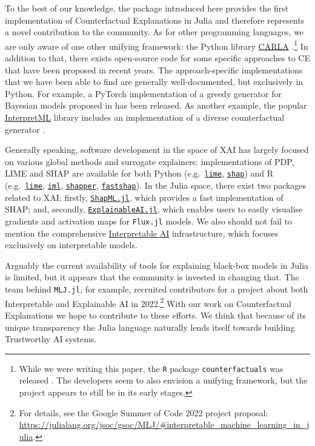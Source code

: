 \documentclass[
  letterpaper,
  DIV=11,
  numbers=noendperiod]{scrartcl}
\begin{document}
To the best of our knowledge, the package introduced here provides the
first implementation of Counterfactual Explanations in Julia and
therefore represents a novel contribution to the community. As for other
programming languages, we are only aware of one other unifying
framework: the Python library
\href{https://carla-counterfactual-and-recourse-library.readthedocs.io/en/latest/?badge=latest}{CARLA}
\cite{pawelczyk2021carla}.\footnote{While we were writing this paper,
  the \texttt{R} package \texttt{counterfactuals} was released
  \cite{dandl2023counterfactuals}. The developers seem to also envision
  a unifying framework, but the project appears to still be in its early
  stages.} In addition to that, there exists open-source code for some
specific approaches to CE that have been proposed in recent years. The
approach-specific implementations that we have been able to find are
generally well-documented, but exclusively in Python. For example, a
PyTorch implementation of a greedy generator for Bayesian models
proposed in \cite{schut2021generating} has been released. As another
example, the popular \href{https://github.com/interpretml}{InterpretML}
library includes an implementation of a diverse counterfactual generator
\cite{mothilal2020explaining}.

Generally speaking, software development in the space of XAI has largely
focused on various global methods and surrogate explainers:
implementations of PDP, LIME and SHAP are available for both Python
(e.g.~\href{https://github.com/marcotcr/lime}{\texttt{lime}},
\href{https://github.com/slundberg/shap}{\texttt{shap}}) and R
(e.g.~\href{https://cran.r-project.org/web/packages/lime/index.html}{\texttt{lime}},
\href{https://cran.r-project.org/web/packages/lime/index.html}{\texttt{iml}},
\href{https://modeloriented.github.io/shapper/}{\texttt{shapper}},
\href{https://github.com/bgreenwell/fastshap}{\texttt{fastshap}}). In
the Julia space, there exist two packages related to XAI: firstly,
\href{https://github.com/nredell/ShapML.jl}{\texttt{ShapML.jl}}, which
provides a fast implementation of SHAP; and, secondly,
\href{https://github.com/adrhill/ExplainableAI.jl}{\texttt{ExplainableAI.jl}},
which enables users to easily visualise gradients and activation maps
for \texttt{Flux.jl} models. We also should not fail to mention the
comprehensive
\href{https://docs.interpretable.ai/stable/IAIBase/data/}{Interpretable
AI} infrastructure, which focuses exclusively on interpretable models.

Arguably the current availability of tools for explaining black-box
models in Julia is limited, but it appears that the community is
invested in changing that. The team behind \texttt{MLJ.jl}, for example,
recruited contributors for a project about both Interpretable and
Explainable AI in 2022.\footnote{For details, see the Google Summer of
  Code 2022 project proposal:
  \url{https://julialang.org/jsoc/gsoc/MLJ/\#interpretable_machine_learning_in_julia}.}
With our work on Counterfactual Explanations we hope to contribute to
these efforts. We think that because of its unique transparency the
Julia language naturally lends itself towards building Trustworthy AI
systems.
\end{document}

